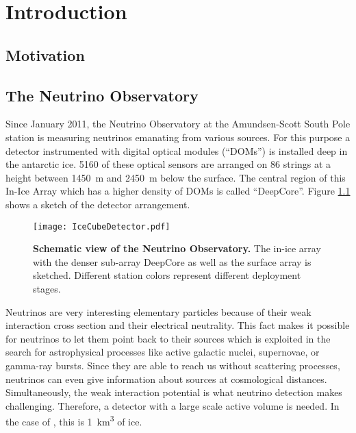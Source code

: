 \chapter{Introduction}


\section{Motivation}


\section{The \icecube Neutrino Observatory}

Since January 2011, the \icecube Neutrino Observatory at the Amundsen-Scott South Pole station is measuring neutrinos emanating from various sources. For this purpose a detector instrumented with digital optical modules (\enquote{DOMs}) is installed deep in the antarctic ice. 5160 of these optical sensors are arranged on 86 strings at a height between \SI{1450}{\meter} and \SI{2450}{\meter} below the surface. The central region of this In-Ice Array which has a higher density of DOMs is called \enquote{DeepCore}. Figure \ref{icecube:detector} shows a sketch of the detector arrangement.\\

\begin{figure}[h]
	\texttt{[image: IceCubeDetector.pdf]}
	\caption[Schematic view of \icecube]{\textbf{Schematic view of the \icecube Neutrino Observatory.} \cite{icecube:instrumentation} The in-ice array with the denser sub-array DeepCore as well as the surface array \icetop is sketched. Different station colors represent different deployment stages.}
	\label{icecube:detector}
\end{figure}

Neutrinos are very interesting elementary particles because of their weak interaction cross section and their electrical neutrality. This fact makes it possible for neutrinos to let them point back to their sources which is exploited in the search for astrophysical processes like active galactic nuclei, supernovae, or gamma-ray bursts. Since they are able to reach us without scattering processes, neutrinos can even give information about sources at cosmological distances. Simultaneously, the weak interaction potential is what neutrino detection makes challenging. Therefore, a detector with a large scale active volume is needed. In the case of \icecube, this is \SI{1}{\cubic\kilo\meter} of ice.\\

